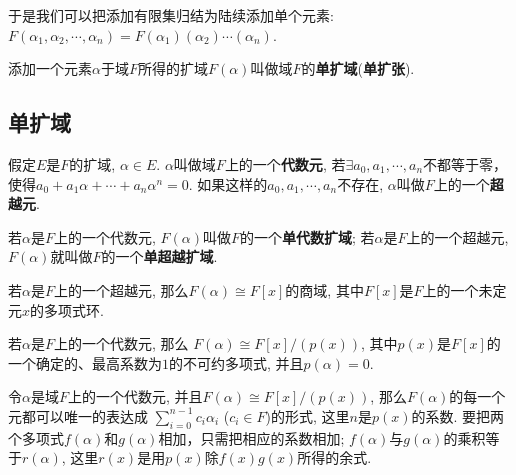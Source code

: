 \begin{Note}
于是我们可以把添加有限集归结为陆续添加单个元素: $F(\alpha_1, \alpha_2, \cdots, \alpha_n)
= F(\alpha_1)(\alpha_2)\cdots(\alpha_n)$.
\end{Note}

\begin{Definition}[单扩域]
添加一个元素$\alpha$于域$F$所得的扩域$F(\alpha)$叫做域$F$的\textbf{单扩域}(\textbf{单扩张}).
\end{Definition}

\subsection{单扩域}

\begin{Definition}
假定$E$是$F$的扩域, $\alpha \in E$. $\alpha$叫做域$F$上的一个\textbf{代数元}, 若$\exists a_0, a_1, \cdots, a_n$不都等于零，使得$a_0 +a_1 \alpha + \cdots + a_n \alpha^n = 0$. 如果这样的$a_0, a_1, \cdots, a_n$不存在, $\alpha$叫做$F$上的一个\textbf{超越元}.
\end{Definition}

\begin{Definition}
若$\alpha$是$F$上的一个代数元, $F(\alpha)$叫做$F$的一个\textbf{单代数扩域}; 
若$\alpha$是$F$上的一个超越元, $F(\alpha)$就叫做$F$的一个\textbf{单超越扩域}.
\end{Definition}

\begin{Theorem}
若$\alpha$是$F$上的一个超越元, 那么$F(\alpha) \cong F[x]$的商域, 其中$F[x]$是$F$上的一个未定元$x$的多项式环.
\end{Theorem}

\begin{Theorem}
若$\alpha$是$F$上的一个代数元, 那么
$F(\alpha) \cong F[x]/\left(p(x)\right)$, 其中$p(x)$是$F[x]$的一个\;\;确定的、最高系数为${1}$的不可约多项式, 并且$p(\alpha) = 0$.
\end{Theorem}

\begin{Theorem}
令$\alpha$是域$F$上的一个代数元, 并且$F(\alpha) \cong F[x]/\left( p(x) \right)$, 
那么$F(\alpha)$的每一个元都可以唯一的表达成
$\displaystyle \sum_{i=0}^{n-1} c_i \alpha_i$
 ($c_i \in F$)的形式, 这里$n$是$p(x)$的系数. 要把两个多项式$f(\alpha)$和$g(\alpha)$相加，只需把相应的系数相加; $f(\alpha)$与$g(\alpha)$的乘积等于$r(\alpha)$, 这里$r(x)$是用$p(x)$除$f(x)g(x)$所得的余式.
\end{Theorem}

